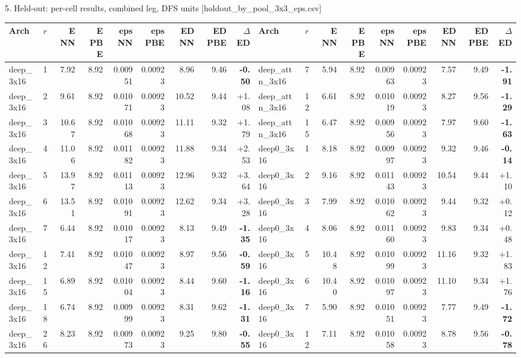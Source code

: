 \begin{frame}{5. Held-out: per-cell results, combined leg, DFS units [holdout\_by\_pool\_3x3\_eps.csv]}
  \begin{center}\tiny\setlength{\tabcolsep}{2.2pt}
  \begin{tabular}{llrrrrrrr|llrrrrrrr}
  \toprule
  Arch & $r$ & E NN & E PBE & eps NN & eps PBE & ED NN & ED PBE & $\Delta$ED & Arch & $r$ & E NN & E PBE & eps NN & eps PBE & ED NN & ED PBE & $\Delta$ED \\ \midrule
  deep\_3x16 & 1 & 7.92 & 8.92 & 0.00951 & 0.00923 & 8.96 & 9.46 & \textbf{-0.50} & deep\_attn\_3x16 & 7 & 5.94 & 8.92 & 0.00963 & 0.00923 & 7.57 & 9.49 & \textbf{-1.91} \\
  deep\_3x16 & 2 & 9.61 & 8.92 & 0.01071 & 0.00923 & 10.52 & 9.44 & +1.08 & deep\_attn\_3x16 & 12 & 6.61 & 8.92 & 0.01019 & 0.00923 & 8.27 & 9.56 & \textbf{-1.29} \\
  deep\_3x16 & 3 & 10.67 & 8.92 & 0.01068 & 0.00923 & 11.11 & 9.32 & +1.79 & deep\_attn\_3x16 & 15 & 6.47 & 8.92 & 0.00956 & 0.00923 & 7.97 & 9.60 & \textbf{-1.63} \\
  deep\_3x16 & 4 & 11.06 & 8.92 & 0.01182 & 0.00923 & 11.88 & 9.34 & +2.53 & deep0\_3x16 & 1 & 8.18 & 8.92 & 0.00997 & 0.00923 & 9.32 & 9.46 & \textbf{-0.14} \\
  deep\_3x16 & 5 & 13.97 & 8.92 & 0.01113 & 0.00923 & 12.96 & 9.32 & +3.64 & deep0\_3x16 & 2 & 9.16 & 8.92 & 0.01143 & 0.00923 & 10.54 & 9.44 & +1.10 \\
  deep\_3x16 & 6 & 13.51 & 8.92 & 0.01091 & 0.00923 & 12.62 & 9.34 & +3.28 & deep0\_3x16 & 3 & 7.99 & 8.92 & 0.01062 & 0.00923 & 9.44 & 9.32 & +0.12 \\
  deep\_3x16 & 7 & 6.44 & 8.92 & 0.01017 & 0.00923 & 8.13 & 9.49 & \textbf{-1.35} & deep0\_3x16 & 4 & 8.06 & 8.92 & 0.01160 & 0.00923 & 9.83 & 9.34 & +0.48 \\
  deep\_3x16 & 12 & 7.41 & 8.92 & 0.01047 & 0.00923 & 8.97 & 9.56 & \textbf{-0.59} & deep0\_3x16 & 5 & 10.48 & 8.92 & 0.01099 & 0.00923 & 11.16 & 9.32 & +1.83 \\
  deep\_3x16 & 15 & 6.89 & 8.92 & 0.01004 & 0.00923 & 8.44 & 9.60 & \textbf{-1.16} & deep0\_3x16 & 6 & 10.40 & 8.92 & 0.01097 & 0.00923 & 11.10 & 9.34 & +1.76 \\
  deep\_3x16 & 18 & 6.74 & 8.92 & 0.00999 & 0.00923 & 8.31 & 9.62 & \textbf{-1.31} & deep0\_3x16 & 7 & 5.90 & 8.92 & 0.01051 & 0.00923 & 7.77 & 9.49 & \textbf{-1.72} \\
  deep\_3x16 & 26 & 8.23 & 8.92 & 0.00973 & 0.00923 & 9.25 & 9.80 & \textbf{-0.55} & deep0\_3x16 & 12 & 7.11 & 8.92 & 0.01058 & 0.00923 & 8.78 & 9.56 & \textbf{-0.78} \\

\end{tabular}
\end{center}
\end{frame}
